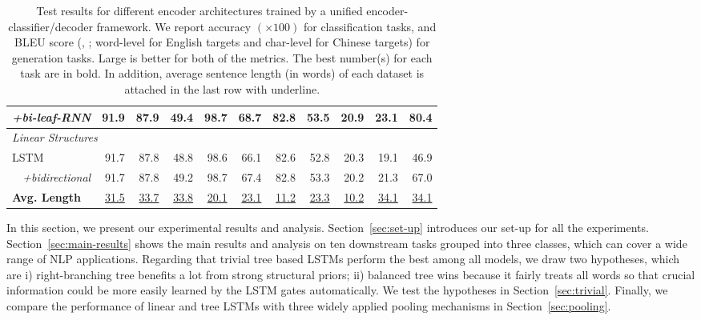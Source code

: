 \documentclass[11pt,a4paper]{article}
\begin{document}
\begin{table*}[t]
\begin{tabular}{l|rrrrr|rr|rrr}
     \multicolumn{1}{r|}{\textit{+bi-leaf-RNN}}  & 91.9 & 87.9  & 49.4 & 98.7  & 68.7  & 82.8 & 53.5  & \bf 20.9 & \bf 23.1  & \bf 80.4  \\
     \midrule
     \multicolumn{11}{l}{\textit{{Linear Structures}}} \\
     \midrule
     LSTM                    & 91.7  & 87.8  & 48.8  & 98.6  & 66.1  & 82.6  & 52.8  & 20.3  & 19.1  & 46.9  \\
     \multicolumn{1}{r|}{\textit{+bidirectional}} & 91.7  & 87.8  & 49.2  & 98.7  & 67.4  & 82.8  & 53.3  & 20.2  & 21.3  & 67.0  \\
     \midrule
     \textbf{Avg. Length}    & \underline{31.5} & \underline{33.7} & \underline{33.8} & \underline{20.1} & \underline{23.1} & \underline{11.2} & \underline{23.3} & \underline{10.2} & \underline{34.1} & \underline{34.1} \\
     \bottomrule
\end{tabular}
\caption{\label{table:main-result} 
Test results for different encoder architectures trained by a unified encoder-classifier/decoder framework. 
We report accuracy $(\times 100)$ for classification tasks, and BLEU score (\citeauthor{papineni2002bleu}, \citeyear{papineni2002bleu}; word-level for English targets and char-level for Chinese targets) for generation tasks. 
Large is better for both of the metrics.
The best number(s) for each task are in bold.
In addition, average sentence length (in words) of each dataset is attached in the last row with underline.  \\[-0.8cm]}
\end{table*}

In this section, we present our experimental results and analysis. 
Section~\ref{sec:set-up} introduces our set-up for all the experiments.
Section~\ref{sec:main-results} shows the main results and analysis on ten downstream tasks grouped into three classes, which can cover a wide range of NLP applications. 
Regarding that trivial tree based LSTMs perform the best among all models, we draw two hypotheses, which are i) right-branching tree benefits a lot from strong structural priors; ii) balanced tree wins because it fairly treats all words  so that crucial information could be more easily learned by the LSTM gates automatically. We test the hypotheses in Section~\ref{sec:trivial}. 
Finally, we compare the performance of linear and tree LSTMs with three widely applied pooling mechanisms in Section~\ref{sec:pooling}.
\end{document}
